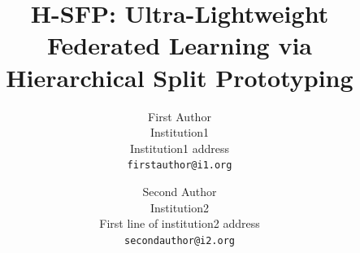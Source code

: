 \documentclass[10pt,twocolumn,letterpaper]{article}
\title{H-SFP: Ultra-Lightweight Federated Learning via Hierarchical Split Prototyping}
\author{First Author\\
Institution1\\
Institution1 address\\
{\tt\small firstauthor@i1.org}
\and
Second Author\\
Institution2\\
First line of institution2 address\\
{\tt\small secondauthor@i2.org}
}
\begin{document}
\maketitle



{
    \small
    
    
}

% 
\end{document}
